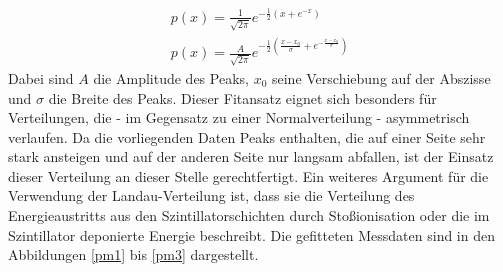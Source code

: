             \begin{eqnarray}
            p(x) = \frac{1}{\sqrt{2\pi}}e^{-\frac{1}{2}\left(x+e^{-x}\right)}\\                
            p(x) = \frac{A}{\sqrt{2\pi}}e^{-\frac{1}{2}\left(\frac{x-x_0}{\sigma}+e^{-\frac{x-x_0}{\sigma}}\right)} \label{eq:landau}
            \label{qtilandaufitfunktion}
            \end{eqnarray}
            Dabei sind $A$ die Amplitude des Peaks, $x_0$ seine Verschiebung auf der Abs\-zisse und $\sigma$ die Breite des Peaks.
            Dieser Fitansatz eignet sich besonders für Verteilungen, die - im Gegensatz zu einer Normalverteilung - asymmetrisch verlaufen. Da die vorliegenden Daten Peaks enthalten, die auf einer Seite sehr stark ansteigen und auf der anderen Seite nur langsam abfallen, ist der Einsatz dieser Verteilung an dieser Stelle gerechtfertigt. 
            Ein weiteres Argument für die Verwendung der Landau-Verteilung ist, dass sie die Verteilung des Energieaustritts aus den Szintillatorschichten durch Stoßionisation oder die im Szintillator deponierte Energie beschreibt. Die gefitteten Messdaten sind in den Abbildungen \ref{pm1} bis \ref{pm3} dargestellt.
